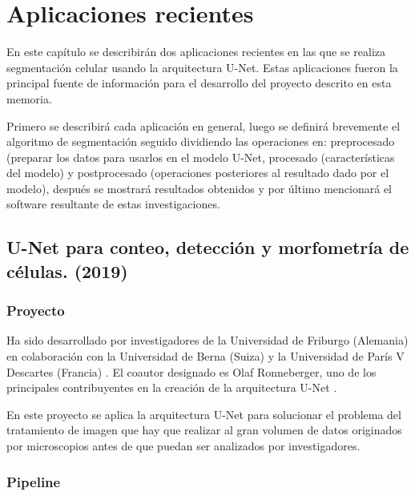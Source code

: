 \chapter{Aplicaciones recientes}\label{apps}

En este capítulo se describirán dos aplicaciones recientes en las que se realiza segmentación celular usando la arquitectura U-Net. Estas aplicaciones fueron la principal fuente de información para el desarrollo del proyecto descrito en esta memoria.

Primero se describirá cada aplicación en general, luego se definirá brevemente el algoritmo de segmentación seguido dividiendo las operaciones en: preprocesado (preparar los datos para usarlos en el modelo U-Net, procesado (características del modelo) y postprocesado (operaciones posteriores al resultado dado por el modelo), después se mostrará resultados obtenidos y por último mencionará el software resultante de estas investigaciones.

\section{U-Net para conteo, detección y morfometría de células. (2019)}\label{sec:app1}
\subsection{Proyecto}\label{apps1_proyect}

Ha sido desarrollado por investigadores de la Universidad de Friburgo (Alemania) en colaboración con la Universidad de Berna (Suiza) y la Universidad de París V Descartes (Francia) \cite{Falk2019}. El coautor designado es Olaf Ronneberger, uno de los principales contribuyentes en la creación de la arquitectura U-Net \cite{Ronneberger2015}.

En este proyecto se aplica la arquitectura U-Net para solucionar el problema del tratamiento de imagen que hay que realizar al gran volumen de datos originados por microscopios antes de que puedan ser analizados por investigadores.

\subsection{Pipeline}\label{apps1_pipeline}

